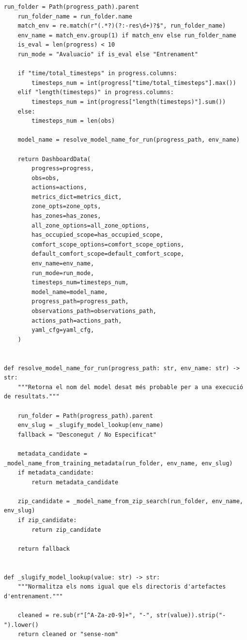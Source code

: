 \documentclass[10pt,a4paper]{article}
\begin{document}
\begin{lstlisting}[style=studioPython,caption={backend/resultats\_backend.py},label={lst:backend-resultats-backend-py}]
    run_folder = Path(progress_path).parent
    run_folder_name = run_folder.name
    match_env = re.match(r"(.*?)(?:-res\d+)?$", run_folder_name)
    env_name = match_env.group(1) if match_env else run_folder_name
    is_eval = len(progress) < 10
    run_mode = "Avaluacio" if is_eval else "Entrenament"

    if "time/total_timesteps" in progress.columns:
        timesteps_num = int(progress["time/total_timesteps"].max())
    elif "length(timesteps)" in progress.columns:
        timesteps_num = int(progress["length(timesteps)"].sum())
    else:
        timesteps_num = len(obs)

    model_name = resolve_model_name_for_run(progress_path, env_name)

    return DashboardData(
        progress=progress,
        obs=obs,
        actions=actions,
        metrics_dict=metrics_dict,
        zone_opts=zone_opts,
        has_zones=has_zones,
        all_zone_options=all_zone_options,
        has_occupied_scope=has_occupied_scope,
        comfort_scope_options=comfort_scope_options,
        default_comfort_scope=default_comfort_scope,
        env_name=env_name,
        run_mode=run_mode,
        timesteps_num=timesteps_num,
        model_name=model_name,
        progress_path=progress_path,
        observations_path=observations_path,
        actions_path=actions_path,
        yaml_cfg=yaml_cfg,
    )


def resolve_model_name_for_run(progress_path: str, env_name: str) -> str:
    """Retorna el nom del model desat més probable per a una execució de resultats."""

    run_folder = Path(progress_path).parent
    env_slug = _slugify_model_lookup(env_name)
    fallback = "Desconegut / No Especificat"

    metadata_candidate = _model_name_from_training_metadata(run_folder, env_name, env_slug)
    if metadata_candidate:
        return metadata_candidate

    zip_candidate = _model_name_from_zip_search(run_folder, env_name, env_slug)
    if zip_candidate:
        return zip_candidate

    return fallback


def _slugify_model_lookup(value: str) -> str:
    """Normalitza els noms igual que els directoris d'artefactes d'entrenament."""

    cleaned = re.sub(r"[^A-Za-z0-9]+", "-", str(value)).strip("-").lower()
    return cleaned or "sense-nom"



\end{lstlisting}
\end{document}
